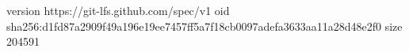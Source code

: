 version https://git-lfs.github.com/spec/v1
oid sha256:d1fd87a2909f49a196e19ee7457ff5a7f18cb0097adefa3633aa11a28d48e2f0
size 204591
